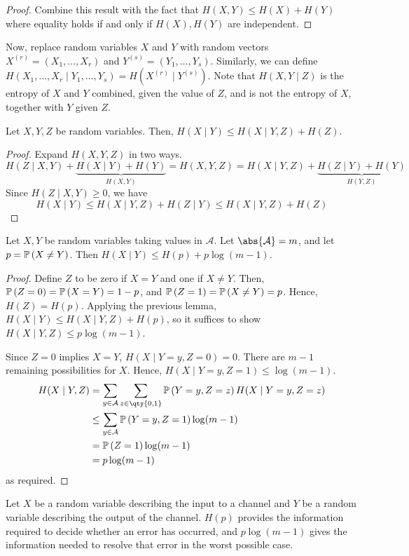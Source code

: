 \begin{proof}
    Combine this result with the fact that $H(X,Y) \leq H(X) + H(Y)$ where equality holds if and only if $H(X), H(Y)$ are independent.
\end{proof}
Now, replace random variables $X$ and $Y$ with random vectors $X^{(r)} = (X_1, \dots, X_r)$ and $Y^{(s)} = (Y_1, \dots, Y_s)$.
Similarly, we can define $H(X_1, \dots, X_r \mid Y_1, \dots, Y_s) = H(X^{(r)} \mid Y^{(s)})$.
Note that $H(X,Y\mid Z)$ is the entropy of $X$ and $Y$ combined, given the value of $Z$, and is not the entropy of $X$, together with $Y$ given $Z$.
\begin{lemma}
    Let $X, Y, Z$ be random variables.
    Then, $H(X \mid Y) \leq H(X \mid Y, Z) + H(Z)$.
\end{lemma}
\begin{proof}
    Expand $H(X,Y,Z)$ in two ways.
    \[ H(Z \mid X,Y) + \underbrace{H(X\mid Y) + H(Y)}_{H(X,Y)} = H(X,Y,Z) = H(X \mid Y,Z) + \underbrace{H(Z \mid Y) + H(Y)}_{H(Y,Z)} \]
    Since $H(Z \mid X,Y) \geq 0$, we have
    \[ H(X \mid Y) \leq H(X \mid Y,Z) + H(Z \mid Y) \leq H(X \mid Y,Z) + H(Z) \]
\end{proof}
\begin{proposition}
    Let $X, Y$ be random variables taking values in $\mathcal A$.
    Let $\abs{\mathcal A} = m$, and let $p = \mathbb{P}\left({X \neq Y}\right)$.
    Then $H(X \mid Y) \leq H(p) + p \log(m-1)$.
\end{proposition}
\begin{proof}
    Define $Z$ to be zero if $X = Y$ and one if $X \neq Y$.
    Then, $\mathbb{P}\left({Z = 0}\right) = \mathbb{P}\left({X = Y}\right) = 1 - p$, and $\mathbb{P}\left({Z = 1}\right) = \mathbb{P}\left({X \neq Y}\right) = p$.
    Hence, $H(Z) = H(p)$.
    Applying the previous lemma, $H(X \mid Y) \leq H(X \mid Y, Z) + H(p)$, so it suffices to show $H(X \mid Y, Z) \leq p\log(m-1)$.

    Since $Z = 0$ implies $X = Y$, $H(X \mid Y = y, Z = 0) = 0$.
    There are $m - 1$ remaining possibilities for $X$.
    Hence, $H(X \mid Y = y, Z = 1) \leq \log(m-1)$.
    \begin{align*}
        H(X \mid Y, Z) &= \sum_{y \in \mathcal A} \sum_{z \in \qty{0,1}} \prob{Y = y, Z = z} H(X \mid Y = y, Z = z) \\
        &\leq \sum_{y \in \mathcal A} \prob{Y = y, Z = 1} \log(m-1) \\
        &= \prob{Z = 1} \log (m-1) \\
        &= p\log(m-1)
    \end{align*}
    as required.
\end{proof}
Let $X$ be a random variable describing the input to a channel and $Y$ be a random variable describing the output of the channel.
$H(p)$ provides the information required to decide whether an error has occurred, and $p\log(m-1)$ gives the information needed to resolve that error in the worst possible case.

